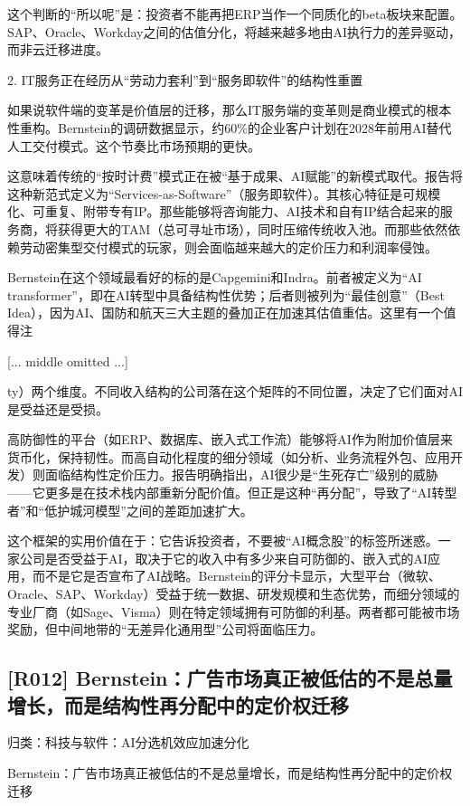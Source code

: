 \documentclass[11pt]{ctexart}
\begin{document}
这个判断的“所以呢”是：投资者不能再把ERP当作一个同质化的beta板块来配置。SAP、Oracle、Workday之间的估值分化，将越来越多地由AI执行力的差异驱动，而非云迁移进度。

2. IT服务正在经历从“劳动力套利”到“服务即软件”的结构性重置

如果说软件端的变革是价值层的迁移，那么IT服务端的变革则是商业模式的根本性重构。Bernstein的调研数据显示，约60\%的企业客户计划在2028年前用AI替代人工交付模式。这个节奏比市场预期的更快。

这意味着传统的“按时计费”模式正在被“基于成果、AI赋能”的新模式取代。报告将这种新范式定义为“Services-as-Software”（服务即软件）。其核心特征是可规模化、可重复、附带专有IP。那些能够将咨询能力、AI技术和自有IP结合起来的服务商，将获得更大的TAM（总可寻址市场），同时压缩传统收入池。而那些依然依赖劳动密集型交付模式的玩家，则会面临越来越大的定价压力和利润率侵蚀。

Bernstein在这个领域最看好的标的是Capgemini和Indra。前者被定义为“AI transformer”，即在AI转型中具备结构性优势；后者则被列为“最佳创意”（Best Idea），因为AI、国防和航天三大主题的叠加正在加速其估值重估。这里有一个值得注

[... middle omitted ...]

ty）两个维度。不同收入结构的公司落在这个矩阵的不同位置，决定了它们面对AI是受益还是受损。

高防御性的平台（如ERP、数据库、嵌入式工作流）能够将AI作为附加价值层来货币化，保持韧性。而高自动化程度的细分领域（如分析、业务流程外包、应用开发）则面临结构性定价压力。报告明确指出，AI很少是“生死存亡”级别的威胁——它更多是在技术栈内部重新分配价值。但正是这种“再分配”，导致了“AI转型者”和“低护城河模型”之间的差距加速扩大。

这个框架的实用价值在于：它告诉投资者，不要被“AI概念股”的标签所迷惑。一家公司是否受益于AI，取决于它的收入中有多少来自可防御的、嵌入式的AI应用，而不是它是否宣布了AI战略。Bernstein的评分卡显示，大型平台（微软、Oracle、SAP、Workday）受益于统一数据、研发规模和生态优势，而细分领域的专业厂商（如Sage、Visma）则在特定领域拥有可防御的利基。两者都可能被市场奖励，但中间地带的“无差异化通用型”公司将面临压力。

\subsection{[R012] Bernstein：广告市场真正被低估的不是总量增长，而是结构性再分配中的定价权迁移}
{\small\color{refgray}归类：科技与软件：AI分选机效应加速分化}

Bernstein：广告市场真正被低估的不是总量增长，而是结构性再分配中的定价权迁移
\end{document}
